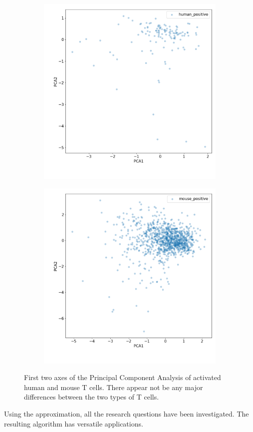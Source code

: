 \begin{figure}[h]
	\centering
	\begin{subfigure}{0.49\linewidth}
		\includegraphics[width=\textwidth]{fig/positive_control_human}
	\end{subfigure}
	\hfill
	\begin{subfigure}{0.49\linewidth}
		\includegraphics[width=\textwidth]{fig/positive_control_mouse}
	\end{subfigure}
	
	\caption{First two axes of the Principal Component Analysis of activated human and mouse T cells. There appear not be any major differences between the two types of T cells.}
	\label{fig:positive_control}
\end{figure}

Using the approximation, all the research questions have been investigated. The resulting algorithm has versatile applications.